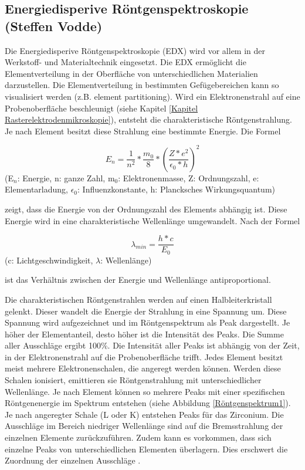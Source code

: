 \documentclass[a4paper, 11pt]{tubsreprt}
\begin{document}
\subsection{Energiedisperive Röntgenspektroskopie (Steffen Vodde)}\label{Kapitel EDX}

Die Energiedisperive Röntgenspektroskopie (EDX) wird vor allem in der Werkstoff- und Materialtechnik eingesetzt. Die EDX ermöglicht die Elementverteilung in der Oberfläche von unterschiedlichen Materialien  darzustellen. Die Elementverteilung in bestimmten Gefügebereichen kann so visualisiert werden (z.B. element partitioning).
Wird ein Elektronenstrahl auf eine Probenoberfläche beschleunigt (siehe Kapitel \ref{Kapitel Rasterelektrodenmikroskopie}), entsteht die charakteristische Röntgenstrahlung. Je nach Element besitzt diese Strahlung eine bestimmte Energie. Die Formel

\begin{equation}
E_{ n }=\frac{ 1 }{ n^{ 2 } }*\frac{ m_{ 0 } }{ 8 }*\left( \frac{ Z*e^{ 2 } }{ \epsilon_{ 0 }*h } \right)^{ 2 }
\end{equation}
(E$_{n}$: Energie, n: ganze Zahl, m$_{0}$: Elektronenmasse, Z: Ordnungszahl, e: Elementarladung, $\epsilon_{0}$: Influenzkonstante, h: Plancksches Wirkungsquantum)\cite{Gemming2013}

zeigt, dass die Energie von der Ordnungszahl des Elements abhängig ist. Diese Energie wird in eine charakteristische Wellenlänge umgewandelt. Nach der Formel  

\begin{equation}
\lambda_{ min }=\frac{ h*c }{ E_{ 0 } }
\end{equation}
(c: Lichtgeschwindigkeit, $\lambda$: Wellenlänge)\cite{Gemming2013}

ist das Verhältnis zwischen der Energie und Wellenlänge antiproportional.

\newpage
Die charakteristischen Röntgenstrahlen werden auf einen Halbleiterkristall gelenkt. Dieser wandelt die Energie der Strahlung in eine Spannung um. Diese Spannung wird aufgezeichnet und im Röntgenspektrum als Peak dargestellt. Je höher der Elementanteil, desto höher ist die Intensität des Peaks. Die Summe aller Ausschläge ergibt 100\%. Die Intensität aller Peaks ist abhängig von der Zeit, in der Elektronenstrahl auf die Probenoberfläche trifft. 
Jedes Element besitzt meist mehrere Elektronenschalen, die angeregt werden können. Werden diese Schalen ionisiert, emittieren sie Röntgenstrahlung mit unterschiedlicher Wellenlänge. Je nach Element können so mehrere Peaks mit einer spezifischen Röntgenenergie im Spektrum entstehen (siehe Abbildung \ref{Röntgenspektrum1}). Je nach angeregter Schale (L oder K) entstehen Peaks für das Zirconium. Die Ausschläge im Bereich niedriger Wellenlänge sind auf die Bremsstrahlung der einzelnen Elemente zurückzuführen. Zudem kann es vorkommen, dass sich einzelne Peaks von unterschiedlichen Elementen überlagern. Dies erschwert die Zuordnung der einzelnen Ausschläge \cite{Gemming2013}. 
\end{document}

